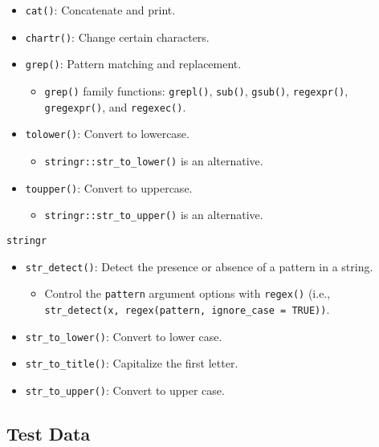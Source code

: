 \documentclass[]{book}
\providecommand{\tightlist}{%
  \setlength{\itemsep}{0pt}\setlength{\parskip}{0pt}}
\theoremstyle{definition}
\theoremstyle{definition}
\theoremstyle{definition}
\theoremstyle{remark}
\begin{document}
\begin{itemize}
\tightlist
\item
  \texttt{cat()}: Concatenate and print.
\item
  \texttt{chartr()}: Change certain characters.
\item
  \texttt{grep()}: Pattern matching and replacement.

  \begin{itemize}
  \tightlist
  \item
    \texttt{grep()} family functions: \texttt{grepl()}, \texttt{sub()},
    \texttt{gsub()}, \texttt{regexpr()}, \texttt{gregexpr()}, and
    \texttt{regexec()}.
  \end{itemize}
\item
  \texttt{tolower()}: Convert to lowercase.

  \begin{itemize}
  \tightlist
  \item
    \texttt{stringr::str\_to\_lower()} is an alternative.
  \end{itemize}
\item
  \texttt{toupper()}: Convert to uppercase.

  \begin{itemize}
  \tightlist
  \item
    \texttt{stringr::str\_to\_upper()} is an alternative.
  \end{itemize}
\end{itemize}

\texttt{stringr}

\begin{itemize}
\tightlist
\item
  \texttt{str\_detect()}: Detect the presence or absence of a pattern in
  a string.

  \begin{itemize}
  \tightlist
  \item
    Control the \texttt{pattern} argument options with \texttt{regex()}
    (i.e.,
    \texttt{str\_detect(x,\ regex(pattern,\ ignore\_case\ =\ TRUE))}.
  \end{itemize}
\item
  \texttt{str\_to\_lower()}: Convert to lower case.
\item
  \texttt{str\_to\_title()}: Capitalize the first letter.
\item
  \texttt{str\_to\_upper()}: Convert to upper case.
\end{itemize}

\subsection{Test Data}\label{test-data}
\end{document}

